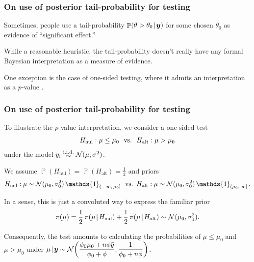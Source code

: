 \documentclass[18pt, handout]{beamer}
\newcommand{\defineTightSpacing}{%
	\setlength{\abovedisplayskip}{.25\baselineskip}%
	\setlength{\belowdisplayskip}{.25\baselineskip}%
}
\newcommand{\given}{\mskip.7\thinmuskip | \mskip.7\thinmuskip}
\DeclareMathOperator{\probability}{\mathbb{P}}
\newcommand{\indicator}{\operatorname{\mathds{1}}}
\newcommand{\iidSim}{\mathrel{\raisebox{-.3ex}{$\overset{\text{i.i.d.}}{\sim}$}}}
\newcommand{\normalDist}{\operatorname{\mathcal{N}}}
\newcommand{\density}{\operatorname{\pi}}
\newcommand{\by}{\bm{y}}
\newcommand{\hypothesis}{H}
\newcommand{\nullSub}{\mathrm{nul}}
\newcommand{\altSub}{\mathrm{alt}}
\begin{document}
\begin{frame}
\frametitle{On use of posterior tail-probability for testing}
Sometimes, people use a tail-probability $\probability( \theta > \theta_0 \given \by )$ for some chosen $\theta_0$ as evidence of ``significant effect.''

\smallskip
While a reasonable heuristic, the tail-probability doesn't really have any formal Bayesian interpretation as a measure of evidence.

\smallskip
One exception is the case of one-sided testing, where it admits an interpretation as a $p$-value \citep{casella1987onesided_testing}.

\end{frame}


\begin{frame}
\frametitle{On use of posterior tail-probability for testing}
To illustrate the $p$-value interpretation, we consider a one-sided test
\begin{equation*} \defineTightSpacing%
\hypothesis_\nullSub: \mu \leq \mu_0 
	\ \text{ vs.\ } \ 
	\hypothesis_\altSub: \mu > \mu_0
\end{equation*}
under the model $y_i \iidSim \normalDist(\mu, \sigma^2)$.

\smallskip
We assume $\probability(\hypothesis_\nullSub) = \probability(\hypothesis_\altSub) = \frac12$ and priors
\begin{equation*} \defineTightSpacing%
\hypothesis_\nullSub: \mu \sim \normalDist(\mu_0, \sigma_0^2) \indicator_{(-\infty, \, \mu_0]}
	\, \text{ vs.\ } \,
	\hypothesis_\altSub: \mu \sim \normalDist(\mu_0, \sigma_0^2) \indicator_{(\mu_0, \, \infty]}.
\end{equation*}

In a sense, this is just a convoluted way to express the familiar prior
\begin{equation*} \defineTightSpacing%
\density(\mu) 
	= \frac{1}{2} \density(\mu \given \hypothesis_\nullSub) + \frac12 \density(\mu \given \hypothesis_\altSub)
	\sim \normalDist(\mu_0, \sigma_0^2).
\end{equation*}

Consequently, the test amounts to calculating the probabilities of $\mu \leq \mu_0$ and $\mu > \mu_0 $ under 
$\displaystyle \mu \given \by \sim \normalDist\!\left( \frac{\phi_0 \mu_0 + n \phi \bar{y}}{\phi_0 + \phi}, \frac{1}{\phi_0 + n \phi} \right)$.
\end{frame}
\end{document}

